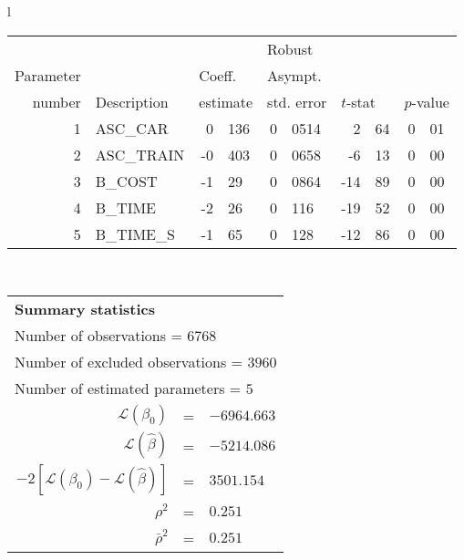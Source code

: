   \begin{tabular}{l}
\begin{tabular}{rlr@{.}lr@{.}lr@{.}lr@{.}l}
         &                       &   \multicolumn{2}{l}{}    & \multicolumn{2}{l}{Robust}  &     \multicolumn{4}{l}{}   \\
Parameter &                       &   \multicolumn{2}{l}{Coeff.}      & \multicolumn{2}{l}{Asympt.}  &     \multicolumn{4}{l}{}   \\
number &  Description                     &   \multicolumn{2}{l}{estimate}      & \multicolumn{2}{l}{std. error}  &   \multicolumn{2}{l}{$t$-stat}  &   \multicolumn{2}{l}{$p$-value}   \\

\hline

1 & ASC_CAR & 0&136 & 0&0514 & 2&64 & 0&01\\
2 & ASC_TRAIN & -0&403 & 0&0658 & -6&13 & 0&00\\
3 & B_COST & -1&29 & 0&0864 & -14&89 & 0&00\\
4 & B_TIME & -2&26 & 0&116 & -19&52 & 0&00\\
5 & B_TIME_S & -1&65 & 0&128 & -12&86 & 0&00\\
\hline
\end{tabular}
\\
\begin{tabular}{rcl}
\multicolumn{3}{l}{\bf Summary statistics}\\
\multicolumn{3}{l}{ Number of observations = $6768$} \\
\multicolumn{3}{l}{ Number of excluded observations = $3960$} \\
\multicolumn{3}{l}{ Number of estimated  parameters = $5$} \\
 $\mathcal{L}(\beta_0)$ &=&  $-6964.663$ \\
 $\mathcal{L}(\hat{\beta})$ &=& $-5214.086 $  \\
 $-2[\mathcal{L}(\beta_0) -\mathcal{L}(\hat{\beta})]$ &=& $3501.154$ \\
    $\rho^2$ &=&   $0.251$ \\
    $\bar{\rho}^2$ &=&    $0.251$ \\
\end{tabular}
  \end{tabular}
